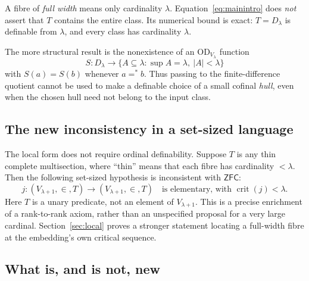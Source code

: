 \documentclass[11pt,letterpaper]{article}
\theoremstyle{definition}
\numberwithin{equation}{section}
\newcommand{\ZFC}{\mathsf{ZFC}}
\newcommand{\OD}{\mathrm{OD}}
\newcommand{\crit}{\operatorname{crit}}
\newcommand{\eqfin}{\mathrel{=^{*}}}
\begin{document}
A fibre of \emph{full width} means only cardinality $\lambda$. Equation~\eqref{eq:mainintro} does \emph{not} assert that $T$ contains the entire class. Its numerical bound is exact: $T=D_\lambda$ is definable from $\lambda$, and every class has cardinality $\lambda$.

The more structural result is the nonexistence of an $\OD_{V_\lambda}$ function
\begin{equation}\label{eq:hullintro}
 S:D_\lambda\longrightarrow
 \{A\subseteq\lambda:\sup A=\lambda,\ |A|<\lambda\}
\end{equation}
with $S(a)=S(b)$ whenever $a\eqfin b$. Thus passing to the finite-difference quotient cannot be used to make a definable choice of a small cofinal \emph{hull}, even when the chosen hull need not belong to the input class.

\subsection{The new inconsistency in a set-sized language}

The local form does not require ordinal definability. Suppose $T$ is any thin complete multisection, where ``thin'' means that each fibre has cardinality $<\lambda$. Then the following set-sized hypothesis is inconsistent with $\ZFC$:
\begin{equation}\label{eq:forbiddenintro}
 j:(V_{\lambda+1},\in,T)\longrightarrow(V_{\lambda+1},\in,T)
 \quad\text{is elementary, with }\crit(j)<\lambda.
\end{equation}
Here $T$ is a unary predicate, not an element of $V_{\lambda+1}$. This is a precise enrichment of a rank-to-rank axiom, rather than an unspecified proposal for a very large cardinal. Section~\ref{sec:local} proves a stronger statement locating a full-width fibre at the embedding's own critical sequence.

\subsection{What is, and is not, new}
\end{document}
